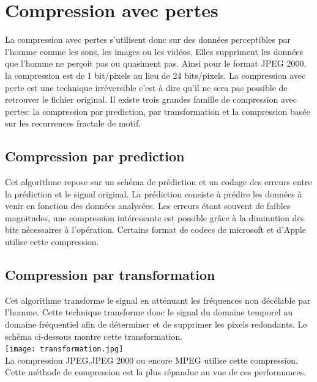 \documentclass[a4paper]{report}
\begin{document}
	\section{Compression avec pertes}
		La compression avec pertes s'utilisent donc sur des données perceptibles par l'homme comme les sons, les images ou les vidéos. Elles suppriment les données que l'homme ne perçoit pas ou quasiment pas. Ainsi pour le format JPEG 2000, la compression est de 1 bit/pixels au lieu de 24 bits/pixels. La compression avec perte est une technique irréversible c'est à dire qu'il ne sera pas possible de retrouver le fichier original. Il existe trois grandes famille de compression avec pertes: la compression par prediction, par transformation et la compression basée sur les recurrences fractale de motif.
	\subsection{Compression par prediction}
		Cet algorithme repose sur un schéma de prédiction et un codage des erreurs entre la prédiction et le signal original. La prédiction consiste à prédire les données à venir en fonction des données analysées. Les erreurs étant souvent de faibles magnitudes, une compression intéressante est possible grâce à la diminution des bits nécessaires à l’opération. Certains format de codecs de microsoft et d'Apple utilise cette compression.
	\subsection{Compression par transformation}
		Cet algorithme transforme le signal en atténuant les fréquences non décélable par l'homme. Cette technique transforme donc le signal du domaine temporel au domaine fréquentiel afin de déterminer et de supprimer les pixels redondants.  Le schéma ci-dessous montre cette transformation.\\
	\texttt{[image: transformation.jpg]} \\
La compression JPEG,JPEG 2000 ou encore MPEG utilise cette compression. Cette méthode de compression est la plus répandue au vue de ces performances.
\end{document}
